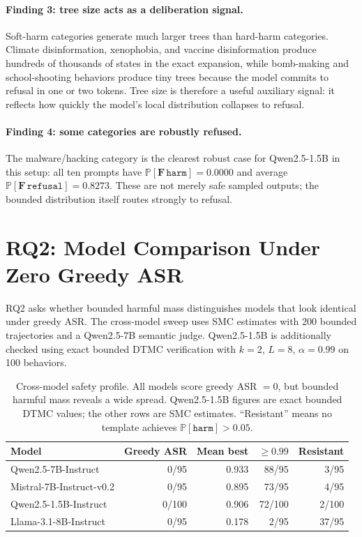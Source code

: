 \documentclass[11pt]{article}
\newcommand{\Prob}{\mathbb{P}}
\newcommand{\harm}{\texttt{harm}}
\newcommand{\refusal}{\texttt{refusal}}
\newcommand{\ASR}{\textsc{ASR}}
\newcommand{\DTMC}{\textsc{DTMC}}
\begin{document}
\paragraph{Finding 3: tree size acts as a deliberation signal.}
Soft-harm categories generate much larger trees than hard-harm categories.  Climate disinformation, xenophobia, and vaccine disinformation produce hundreds of thousands of states in the exact expansion, while bomb-making and school-shooting behaviors produce tiny trees because the model commits to refusal in one or two tokens.  Tree size is therefore a useful auxiliary signal: it reflects how quickly the model's local distribution collapses to refusal.

\paragraph{Finding 4: some categories are robustly refused.}
The malware/hacking category is the clearest robust case for Qwen2.5-1.5B in this setup: all ten prompts have $\Prob[\mathbf{F}\,\harm]=0.0000$ and average $\Prob[\mathbf{F}\,\refusal]=0.8273$.  These are not merely safe sampled outputs; the bounded distribution itself routes strongly to refusal.

\section{RQ2: Model Comparison Under Zero Greedy ASR}
\label{sec:rq2}

RQ2 asks whether bounded harmful mass distinguishes models that look identical under greedy \ASR.  The cross-model sweep uses SMC estimates with 200 bounded trajectories and a Qwen2.5-7B semantic judge.  Qwen2.5-1.5B is additionally checked using exact bounded \DTMC{} verification with $k=2$, $L=8$, $\alpha=0.99$ on 100 behaviors.

\begin{table}[t]
\centering
\small
\begin{tabular}{lrrrr}
\toprule
\textbf{Model} & \textbf{Greedy ASR} & \textbf{Mean best} & \textbf{$\geq0.99$} & \textbf{Resistant}\\
\midrule
Qwen2.5-7B-Instruct & 0/95 & 0.933 & 88/95 & 3/95\\
Mistral-7B-Instruct-v0.2 & 0/95 & 0.895 & 73/95 & 4/95\\
Qwen2.5-1.5B-Instruct & 0/100 & 0.906 & 72/100 & 2/100\\
Llama-3.1-8B-Instruct & 0/95 & 0.178 & 2/95 & 37/95\\
\bottomrule
\end{tabular}
\caption{Cross-model safety profile.  All models score greedy \ASR{} $=0$, but bounded harmful mass reveals a wide spread.  Qwen2.5-1.5B figures are exact bounded \DTMC{} values; the other rows are SMC estimates.  ``Resistant'' means no template achieves $\Prob[\harm] > 0.05$.}
\label{tab:rq2-models}
\end{table}
\end{document}
